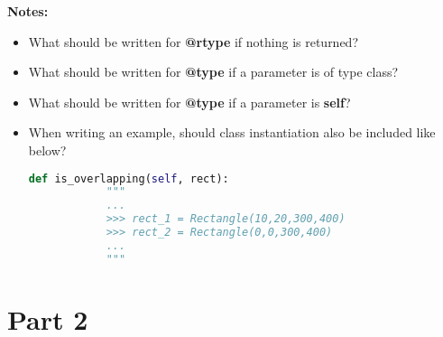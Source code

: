\documentclass[12pt]{article}
\begin{document}
\begin{enumerate}
    \bigskip

    \textbf{Notes:}

    \begin{itemize}
    \item What should be written for \textbf{@rtype} if nothing is returned?
    \item What should be written for \textbf{@type} if a parameter is of type class?
    \item What should be written for \textbf{@type} if a parameter is \textbf{self}?
    \item When writing an example, should class instantiation also be included like below?

    \begin{lstlisting}[language=Python]
        def is_overlapping(self, rect):
            """
            ...
            >>> rect_1 = Rectangle(10,20,300,400)
            >>> rect_2 = Rectangle(0,0,300,400)
            ...
            """
    \end{lstlisting}
    \end{itemize}
\end{enumerate}

\section*{Part 2}
\end{document}
